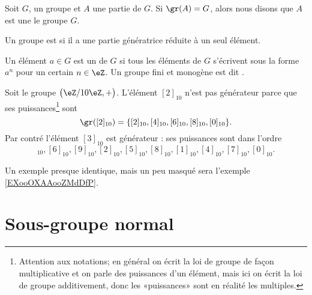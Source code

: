 \begin{definition}  \label{DEFooWMFVooLDqVxR}
    Soit \( G\), un groupe et \( A\) une partie de \( G\). Si \( \gr(A)=G\), alors nous disons que \( A\) est une  le groupe \( G\).

    Un groupe est  si il a une partie génératrice réduite à un seul élément.
\end{definition}

\begin{definition}     \label{DefHFJWooFxkzCF}
    Un élément \( a\in G\) est un  de \( G\) si tous les éléments de \( G\) s'écrivent sous la forme \( a^n\) pour un certain \( n\in\eZ\). Un groupe fini et monogène est dit .
\end{definition}

\begin{example}
    Soit le groupe \( \big( \eZ/10\eZ,+ \big)\). L'élément \( [2]_{10}\) n'est pas générateur parce que ses puissances\footnote{Attention aux notations; en général on écrit la loi de groupe de façon multiplicative et on parle des puissances d'un élément, mais ici on écrit la loi de groupe additivement, donc les «puissances» sont en réalité les multiples.} sont
    \begin{equation}
        \gr([2]_{10})=\{ [2]_{10},[4]_{10},[6]_{10},[8]_{10},[0]_{10} \}.
    \end{equation}
    Par contré l'élément \( [3]_{10}\) est générateur : ses puissances sont dans l'ordre
    \begin{equation}
        [3]_{10}, [6]_{10}, [9]_{10}, [2]_{10}, [5]_{10}, [8]_{10},[1]_{10},[4]_{10},[7]_{10},[0]_{10}.
    \end{equation}
\end{example}

Un exemple presque identique, mais un peu masqué sera l'exemple \ref{EXooOXAAooZMdDfP}.

\section{Sous-groupe normal}

